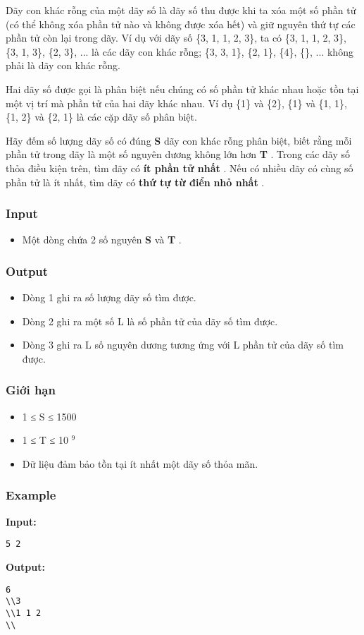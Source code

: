 



   Dãy con khác rỗng của một dãy số là dãy số thu được khi ta xóa một số phần tử (có thể không xóa phần tử nào và không được xóa hết) và giữ nguyên thứ tự các phần tử còn lại trong dãy. Ví dụ với dãy số \{3, 1, 1, 2, 3\}, ta có \{3, 1, 1, 2, 3\}, \{3, 1, 3\}, \{2, 3\}, ... là các dãy con khác rỗng; \{3, 3, 1\}, \{2, 1\}, \{4\}, \{\}, ... không phải là dãy con khác rỗng.  

   Hai dãy số được gọi là phân biệt nếu chúng có số phần tử khác nhau hoặc tồn tại một vị trí mà phần tử của hai dãy khác nhau. Ví dụ \{1\} và \{2\}, \{1\} và \{1, 1\}, \{1, 2\} và \{2, 1\} là các cặp dãy số phân biệt.  

   Hãy đếm số lượng dãy số có đúng   \textbf{    S   }   dãy con khác rỗng phân biệt, biết rằng mỗi phần tử trong dãy là một số nguyên dương không lớn hơn   \textbf{    T   }   . Trong các dãy số thỏa điều kiện trên, tìm dãy có   \textbf{    ít phần tử nhất   }   . Nếu có nhiều dãy có cùng số phần tử là ít nhất, tìm dãy có   \textbf{    thứ tự từ điển   }\textbf{    nhỏ nhất   }   .  

\subsubsection{   Input  }
\begin{itemize}
	\item     Một dòng chứa 2 số nguyên    \textbf{     S    }    và    \textbf{     T    }    .   
\end{itemize}

\subsubsection{   Output  }
\begin{itemize}
	\item     Dòng 1 ghi ra số lượng dãy số tìm được.   
	\item     Dòng 2 ghi ra một số L là số phần tử của dãy số tìm được.   
	\item     Dòng 3 ghi ra L số nguyên dương tương ứng với L phần tử của dãy số tìm được.   
\end{itemize}

\subsubsection{   Giới hạn  }
\begin{itemize}
	\item     1 ≤ S ≤ 1500   
	\item     1 ≤ T ≤ 10    $^     9    $
	\item     Dữ liệu đảm bảo tồn tại ít nhất một dãy số thỏa mãn.   
\end{itemize}

\subsubsection{   Example  }

\textbf{    Input:   }
\begin{verbatim}
5 2\end{verbatim}

\textbf{    Output:   }
\begin{verbatim}
6
\\3
\\1 1 2 
\\\end{verbatim}